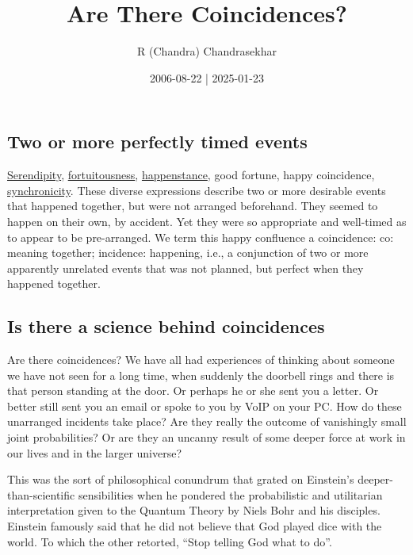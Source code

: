 \documentclass[
  a4paper,
]{article}
\title{Are There Coincidences?}
\author{R (Chandra) Chandrasekhar}
\date{2006-08-22 | 2025-01-23}
\begin{document}
\maketitle

\thispagestyle{empty}


\subsection{Two or more perfectly timed
events}\label{two-or-more-perfectly-timed-events}

\href{https://www.merriam-webster.com/dictionary/serendipity}{Serendipity},
\href{https://dictionary.cambridge.org/dictionary/english/fortuitousness}{fortuitousness},
\href{https://www.collinsdictionary.com/dictionary/english/happenstance}{happenstance},
good fortune, happy coincidence,
\href{https://www.vocabulary.com/dictionary/synchronicity}{synchronicity}.
These diverse expressions describe two or more desirable events that
happened together, but were not arranged beforehand. They seemed to
happen on their own, by accident. Yet they were so appropriate and
well-timed as to appear to be pre-arranged. We term this happy
confluence a coincidence: co: meaning together; incidence: happening,
i.e., a conjunction of two or more apparently unrelated events that was
not planned, but perfect when they happened together.

\subsection{Is there a science behind
coincidences}\label{is-there-a-science-behind-coincidences}

Are there coincidences? We have all had experiences of thinking about
someone we have not seen for a long time, when suddenly the doorbell
rings and there is that person standing at the door. Or perhaps he or
she sent you a letter. Or better still sent you an email or spoke to you
by VoIP on your PC. How do these unarranged incidents take place? Are
they really the outcome of vanishingly small joint probabilities? Or are
they an uncanny result of some deeper force at work in our lives and in
the larger universe?

This was the sort of philosophical conundrum that grated on Einstein's
deeper-than-scientific sensibilities when he pondered the probabilistic
and utilitarian interpretation given to the Quantum Theory by Niels Bohr
and his disciples. Einstein famously said that he did not believe that
God played dice with the world. To which the other retorted, ``Stop
telling God what to do''.
\end{document}
